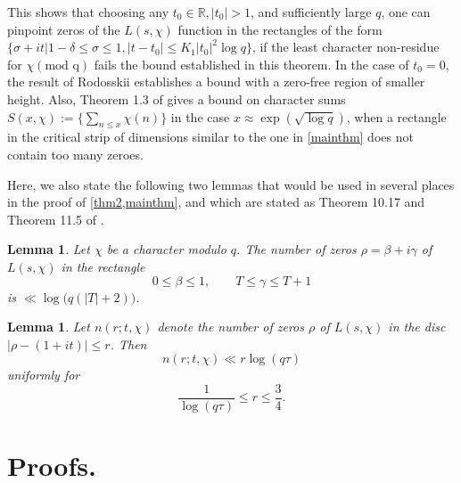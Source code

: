 \documentclass[letter,12pt]{article}
\newcounter{lem}
\theoremstyle{plain}
\newtheorem{lemma}[theorem]{Lemma}
\theoremstyle{definition}
\theoremstyle{plain}
\newcommand{\R}{\mathbb{R}}
\begin{document}
This shows that choosing any $t_0\in \R, |t_0|> 1$, and sufficiently large $q$, one can pinpoint zeros of the $L(s,\chi)$ function in the rectangles of the form $\{\sigma +it| 1-\delta\leq  \sigma\leq 1, |t-t_0|\leq K_1|t_0|^{2}\log q \}$, if the least character non-residue for $\chi(\text{mod q})$ fails the bound established in this theorem. In the case of $t_0=0$, the result of Rodosskii establishes a  bound with a zero-free region of smaller height. Also, Theorem 1.3 of \cite{Sound} gives a bound on character sums $S(x,\chi):=\{\sum\limits_{n\leq x}\chi(n)\}$ in the case $x\approx \exp(\sqrt{\log q})$, when a rectangle in the critical strip of dimensions similar to the one in \cref{mainthm} does not contain too many zeroes.

Here, we also state the following two lemmas that would be used in several places in the proof of \cref{thm2,mainthm}, and which are stated as Theorem 10.17 and Theorem 11.5 of \cite{Mont}.

\begin{lemma}\label{lemma2}
Let $\chi$ be a character modulo $q$. The number of zeros 
$\rho = \beta + i\gamma$ of $L(s,\chi)$ in the rectangle
\[
0 \le \beta \le 1, \qquad T \le \gamma \le T+1
\]
is $\ll \log\bigl(q(|T|+2)\bigr)$.
\end{lemma}

\begin{lemma}\label{lemma}
    Let $n(r;t,\chi)$ denote the number of zeros $\rho$ of $L(s,\chi)$ in the disc 
$|\rho-(1+it)|\le r$. Then
\[
n(r;t,\chi)\ll r\log(q\tau)
\]
uniformly for
\[
\frac{1}{\log(q\tau)} \le r \le \frac{3}{4}.
\]
\end{lemma}

\section{Proofs.}
\end{document}
